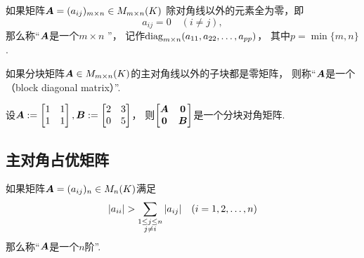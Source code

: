 \begin{definition}
如果矩阵\(\boldsymbol{A}=(a_{ij})_{m \times n} \in M_{m \times n}(K)\)
除对角线以外的元素全为零，即\begin{equation*}
	a_{ij} = 0
	\quad(i \neq j),
\end{equation*}
那么称“\(\boldsymbol{A}\)是一个\(m \times n\) ”，
记作\(\operatorname{diag}_{m \times n}(a_{11},a_{22},\dotsc,a_{pp})\)，
其中\(p = \min\{m,n\}\).
\end{definition}

\begin{definition}
如果分块矩阵\(\boldsymbol{A} \in M_{m \times n}(K)\)的主对角线以外的子块都是零矩阵，
则称“\(\boldsymbol{A}\)是一个（block diagonal matrix）”.
\end{definition}

\begin{example}
设\(
	\boldsymbol{A}
	:=
	\begin{bmatrix}
		1 & 1 \\
		1 & 1 \\
	\end{bmatrix},
	\boldsymbol{B}
	:=
	\begin{bmatrix}
		2 & 3 \\
		0 & 5 \\
	\end{bmatrix}
\)，
则\(
	\begin{bmatrix}
		\boldsymbol{A} & \boldsymbol0 \\
		\boldsymbol0 & \boldsymbol{B} \\
	\end{bmatrix}
\)是一个分块对角矩阵.
\end{example}

\subsection{主对角占优矩阵}
\begin{definition}
如果矩阵\(\boldsymbol{A}=(a_{ij})_n \in M_n(K)\)满足\begin{equation*}
	\abs{a_{ii}} > \sum_{\substack{1 \leq j \leq n \\ j \neq i}} \abs{a_{ij}}
	\quad (i=1,2,\dotsc,n)
\end{equation*}
那么称“\(\boldsymbol{A}\)是一个\(n\)阶”.
\end{definition}

